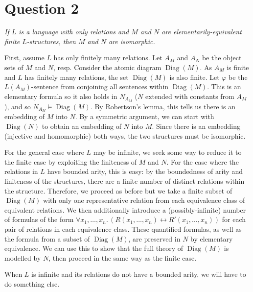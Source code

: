 \documentclass[a4paper]{article}
\DeclareMathOperator{\Diag}{Diag}
\begin{document}
\section*{Question 2}
\begin{center}
  \textit{If $L$ is a language with only relations and $M$ and $N$ are
  elementarily-equivalent finite $L$-structures, then $M$ and $N$ are isomorphic.}
\end{center}
First, assume $L$ has only finitely many relations.
Let $A_M$ and $A_N$ be the object sets of $M$ and $N$, resp.
Consider the atomic diagram $\Diag(M)$.
As $A_M$ is finite and $L$ has finitely many relations,
the set $\Diag(M)$ is also finite.
Let $\varphi$ be the $L(A_M)$-sentence from conjoining all
sentences within $\Diag(M)$.
This is an elementary formula so it also holds in $N_{A_M}$
($N$ extended with constants from $A_M$), and so
$N_{A_M} \models \Diag(M)$.
By Robertson's lemma, this tells us there is an embedding of
$M$ into $N$.
By a symmetric argument, we can start with $\Diag(N)$ to obtain
an embedding of $N$ into $M$.
Since there is an embedding (injective and homomorphic) both ways, the two structures must be isomorphic.

For the general case where $L$ may be infinite, we seek some way to reduce
it to the finite case by exploiting the finiteness of $M$ and $N$.
For the case where the relations in $L$ have bounded arity,
this is easy:
by the boundedness of arity and finiteness of the structures,
there are a finite number of distinct relations within the structure.
Therefore, we proceed as before but we take a finite subset of $\Diag(M)$
with only one representative relation from each equivalence class of equivalent
relations.
We then additionally introduce a (possibly-infinite) number of formulas
of the form $\forall x_1,\ldots,x_n.\, (R(x_1,\ldots,x_n) \longleftrightarrow R'(x_1,\ldots,x_n))$
for each pair of relations in each equivalence class.
These quantified formulas, as well as the formula from a subset of $\Diag(M)$,
are preserved in $N$ by elementary equivalence.
We can use this to show that the full theory of $\Diag(M)$ is modelled by $N$,
then proceed in the same way as the finite case.

When $L$ is infinite and its relations do not have a bounded arity,
we will have to do something else.
\end{document}
